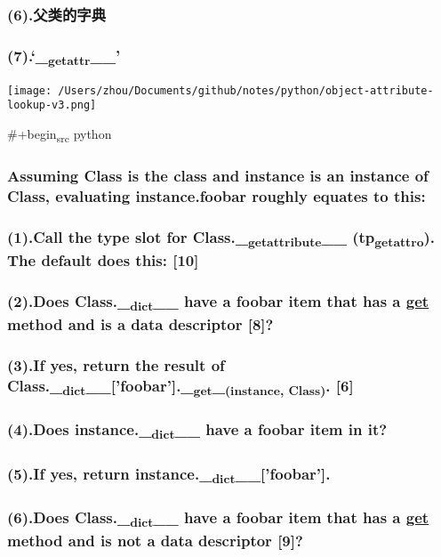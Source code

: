 \documentclass[11pt]{article}
\begin{document}
\subsubsection{(6).父类的字典}
\label{sec:orgc185343}
\subsubsection{(7).`\_\textsubscript{getattr}\_\_'}
\label{sec:org0fe229b}
\begin{center}
\texttt{[image: /Users/zhou/Documents/github/notes/python/object-attribute-lookup-v3.png]}
\end{center}

\#+begin\textsubscript{src} python
\subsubsection{Assuming Class is the class and instance is an instance of Class, evaluating instance.foobar roughly equates to this:}
\label{sec:org101c358}
\subsubsection{(1).Call the type slot for Class.\_\textsubscript{getattribute}\_\_ (tp\textsubscript{getattro}). The default does this: [10]}
\label{sec:org9e824fe}
\subsubsection{(2).Does Class.\_\textsubscript{dict}\_\_ have a foobar item that has a \underline{\underline{get}} method and is a data descriptor [8]?}
\label{sec:org79bae76}
\subsubsection{(3).If yes, return the result of Class.\_\textsubscript{dict}\_\_['foobar'].\_\textsubscript{get}\_\textsubscript{(instance, Class)}. [6]}
\label{sec:orgbe5b179}
\subsubsection{(4).Does instance.\_\textsubscript{dict}\_\_ have a foobar item in it?}
\label{sec:orgeb03a2a}
\subsubsection{(5).If yes, return instance.\_\textsubscript{dict}\_\_['foobar'].}
\label{sec:orgb3b7f40}
\subsubsection{(6).Does Class.\_\textsubscript{dict}\_\_ have a foobar item that has a \underline{\underline{get}} method and is not a data descriptor [9]?}
\label{sec:org4b6a587}
\end{document}
